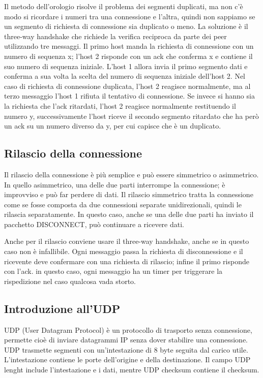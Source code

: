 Il metodo dell'orologio risolve il problema dei segmenti duplicati, ma non c'è modo si ricordare i numeri tra una connessione e l'altra, quindi non sappiamo se un segmento di richiesta di connessione sia duplicato o meno.
La soluzione è il three-way handshake che richiede la verifica reciproca da parte dei peer utilizzando tre messaggi.
Il primo host manda la richiesta di connessione con un numero di sequenza x; l'host 2 risponde con un ack che conferma x e contiene il suo numero di sequenza iniziale. L'host 1 allora invia il primo segmento dati e conferma a sua volta la scelta del numero di sequenza iniziale dell'host 2.
Nel caso di richiesta di connessione duplicata, l'host 2 reagisce normalmente, ma al terzo messaggio l'host 1 rifiuta il tentativo di connessione.
Se invece si hanno sia la richiesta che l'ack ritardati, l'host 2 reagisce normalmente restituendo il numero y, successivamente l'host riceve il secondo segmento ritardato che ha però un ack su un numero diverso da y, per cui capisce che è un duplicato.

\subsection{Rilascio della connessione}
Il rilascio della connessione è più semplice e può essere simmetrico o asimmetrico.
In quello asimmetrico, una delle due parti interrompe la connessione; è improvviso e può far perdere di dati.
Il rilascio simmetrico tratta la connessione come se fosse composta da due connessioni separate unidirezionali, quindi le rilascia separatamente.
In questo caso, anche se una delle due parti ha inviato il pacchetto DISCONNECT, può continuare a ricevere dati.

Anche per il rilascio conviene usare il three-way handshake, anche se in questo caso non è infallibile.
Ogni messaggio passa la richiesta di disconnessione e il ricevente deve confermare con una richiesta di rilascio; infine il primo risponde con l'ack.
in questo caso, ogni messaggio ha un timer per triggerare la rispedizione nel caso qualcosa vada storto.

\subsection{Introduzione all'UDP}
UDP (User Datagram Protocol) è un protocollo di trasporto senza connessione, permette cioè di inviare datagrammi IP senza dover stabilire una connessione.
UDP trasmette segmenti con un'intestazione di 8 byte seguita dal carico utile.
L'intestazione contiene le porte dell'origine e della destinazione.
Il campo UDP lenght include l'intestazione e i dati, mentre UDP checksum contiene il checksum.

